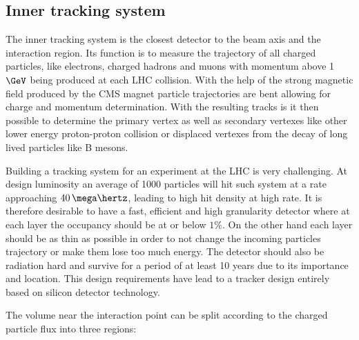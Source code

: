 \subsection{Inner tracking system}
\label{SUBSECTION:ExperimentalApparatus_CMS_Tracker}

%

The inner tracking system is the closest detector to the beam axis and the interaction region. Its function is to measure the trajectory of all charged particles, like electrons, charged hadrons and muons with momentum above 1 $\GeV$ being produced at each \gls{LHC} collision. With the help of the strong magnetic field produced by the \gls{CMS} magnet particle trajectories are bent allowing for charge and momentum determination. With the resulting tracks is it then possible to determine the primary vertex as well as secondary vertexes like other lower energy proton-proton collision or displaced vertexes from the decay of long lived particles like B mesons.

Building a tracking system for an experiment at the \gls{LHC} is very challenging. At design luminosity an average of 1000 particles will hit such system at a rate approaching $40\,\mega\hertz$, leading to high hit density at high rate. It is therefore desirable to have a fast, efficient and high granularity detector where at each layer the occupancy should be at or below $1\%$. On the other hand each layer should be as thin as possible in order to not change the incoming particles trajectory or make them lose too much energy. The detector should also be radiation hard and survive for a period of at least 10 years due to its importance and location. This design requirements have lead to a tracker design entirely based on silicon detector technology. 

The volume near the interaction point can be split according to the charged particle flux into three regions:

